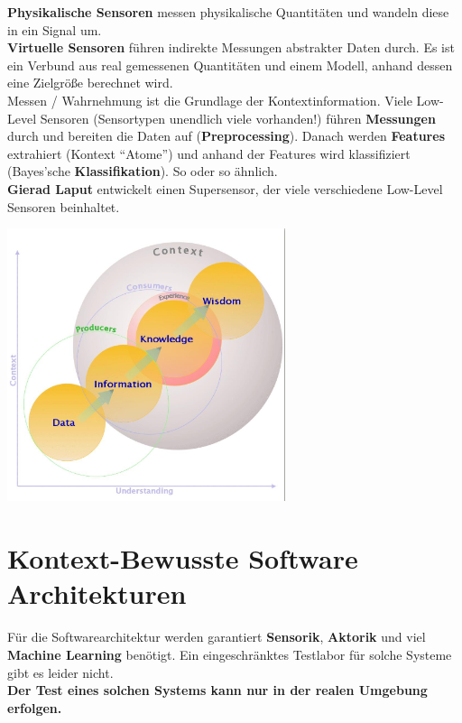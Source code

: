 \documentclass[a4paper]{article}
\begin{document}
\textbf{Physikalische Sensoren} messen physikalische Quantitäten und wandeln diese in ein Signal um.\\
\textbf{Virtuelle Sensoren} führen indirekte Messungen abstrakter Daten durch. Es ist ein Verbund aus real gemessenen Quantitäten und einem Modell, anhand dessen eine Zielgröße berechnet wird.\\

Messen / Wahrnehmung ist die Grundlage der Kontextinformation. Viele Low-Level Sensoren (Sensortypen unendlich viele vorhanden!) führen \textbf{Messungen} durch und bereiten die Daten auf (\textbf{Preprocessing}). Danach werden \textbf{Features} extrahiert (Kontext ``Atome'') und anhand der Features wird klassifiziert (Bayes'sche \textbf{Klassifikation}). So oder so ähnlich.\\

\textbf{Gierad Laput} entwickelt einen Supersensor, der viele verschiedene Low-Level Sensoren beinhaltet. \\

\begin{center}
	\includegraphics[height = 8cm]{Kontext.png}
\end{center}
\newpage

\section{Kontext-Bewusste Software Architekturen}
Für die Softwarearchitektur werden garantiert \textbf{Sensorik}, \textbf{Aktorik} und viel \textbf{Machine Learning} benötigt. Ein eingeschränktes Testlabor für solche Systeme gibt es leider nicht.\\

\textbf{Der Test eines solchen Systems kann nur in der realen Umgebung erfolgen.}
\end{document}
